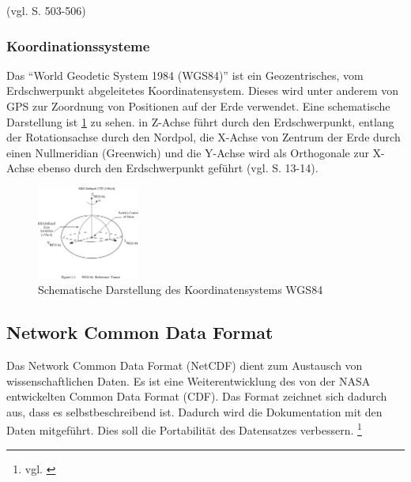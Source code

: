 (vgl. \cite{witte2011vermessungskunde} S. 503-506)

\subsubsection{Koordinationssysteme}

Das "`World Geodetic System 1984 (WGS84)"' ist ein Geozentrisches, vom Erdschwerpunkt abgeleitetes Koordinatensystem. Dieses wird unter anderem von GPS zur Zoordnung von Positionen auf der Erde verwendet. Eine schematische Darstellung ist \ref{fig:wgs84} zu sehen. in  Z-Achse führt durch den Erdschwerpunkt, entlang der Rotationsachse durch den Nordpol, die X-Achse von Zentrum der Erde durch einen Nullmeridian (Greenwich) und die Y-Achse wird als Orthogonale zur X-Achse ebenso durch den Erdschwerpunkt geführt (vgl. \cite{witte2011vermessungskunde} S. 13-14).






\begin{figure}[h!]
 \centering
 \includegraphics[width=0.3\textwidth, trim={0 9cm 0 3cm},clip]{pix/WGS_84_reference_frame.png}
 \caption[Schematische Darstellung des Koordinatensystems WGS84 - Bildquelle: \url{https://commons.wikimedia.org/wiki/File:WGS_84_reference_frame_(vector_graphic).svg}]{Schematische Darstellung des Koordinatensystems WGS84}
 \label{fig:wgs84}
\end{figure}





    

    \subsection{Network Common Data Format}
    
    Das Network Common Data Format (NetCDF) dient zum Austausch von wissenschaftlichen Daten. Es ist eine Weiterentwicklung des von der NASA entwickelten Common Data Format (CDF). Das Format zeichnet sich dadurch aus, dass es selbstbeschreibend ist. Dadurch wird die Dokumentation mit den Daten mitgeführt. Dies soll die Portabilität des Datensatzes verbessern.  \footnote{vgl. \cite{FisherNetCDF}}
   
